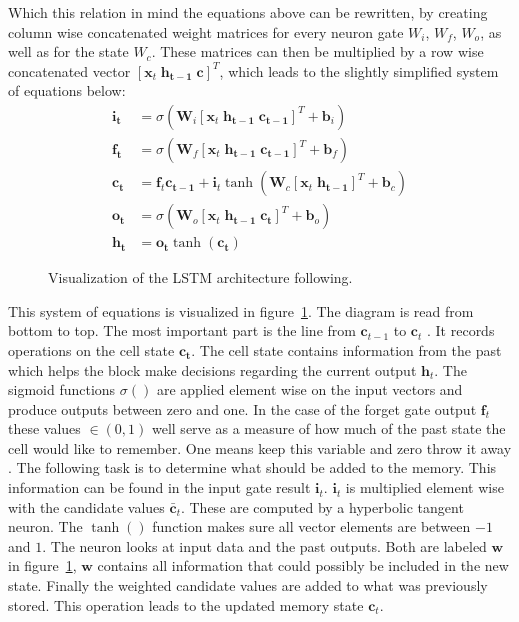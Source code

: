 Which this relation in mind the equations above can be rewritten, by creating column wise concatenated weight matrices for every neuron gate $W_i$, $W_f$, $W_o$, as well as for the state $W_c$. These matrices can then be multiplied by a row wise concatenated vector $[\mathbf{x}_t \; \mathbf{h_{t-1}} \; \mathbf{c}]^T$, which leads to the slightly simplified system of equations below:
\begin{align}
\mathbf{i_t} &= \sigma (\mathbf{W}_i [\mathbf{x}_t \; \mathbf{h_{t-1}} \; \mathbf{c_{t-1}}]^T + \mathbf{b}_i) \\
\mathbf{f_t} &= \sigma (\mathbf{W}_f [\mathbf{x}_t \; \mathbf{h_{t-1}} \; \mathbf{c_{t-1}}]^T + \mathbf{b}_f) \\
\mathbf{c_t} &= \mathbf{f}_t \mathbf{c_{t-1}} + \mathbf{i}_t \tanh( \mathbf{W}_c [\mathbf{x}_t \; \mathbf{h_{t-1}}]^T + \mathbf{b}_c ) \\
\mathbf{o_t} &= \sigma (\mathbf{W}_o [\mathbf{x}_t \; \mathbf{h_{t-1}} \; \mathbf{c_t}]^T + \mathbf{b}_o ) \\
\mathbf{h_t} &= \mathbf{o_t} \tanh(\mathbf{c_t})
\end{align}
\begin{figure}

\caption{Visualization of the LSTM architecture following.}
\label{fig:lstm}
\end{figure}
This system of equations is visualized in figure~\ref{fig:lstm}. The diagram is read from bottom to top. The most important part is the line from $\mathbf{c}_{t-1}$ to $\mathbf{c}_{t}$ \cite{Colah2015}. It records operations on the cell state $\mathbf{c_t}$. The cell state contains information from the past which helps the block make decisions regarding the current output $\mathbf{h}_t$. The sigmoid functions $\sigma()$ are applied element wise on the input vectors and produce outputs between zero and one. In the case of the forget gate output $\mathbf{f}_t$ these values $\in (0,1)$ well serve as a measure of how much of the past state the cell would like to remember. One means keep this variable and zero throw it away \cite{Colah2015}. 
The following task is to determine what should be added to the memory. This information can be found in the input gate result $\mathbf{i}_t$. $\mathbf{i}_t$ is multiplied element wise with the candidate values $\mathbf{\bar{c}}_t$. These are computed by a hyperbolic tangent neuron.  The $\tanh()$ function makes sure all vector elements are between $-1$ and $1$. The neuron looks at input data and the past outputs. Both are labeled $\mathbf{w}$ in figure~\ref{fig:lstm}, $\mathbf{w}$ contains all information that could possibly be included in the new state. Finally the weighted candidate values are added to what was previously stored. This operation leads to the updated memory state $\mathbf{c}_t$. 
